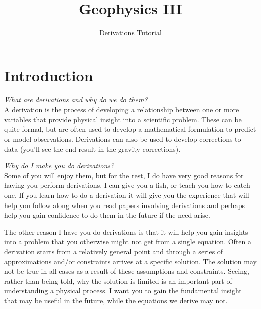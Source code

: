 \documentclass[final,a4paper,12pt]{article}
\title{Geophysics III}
\author{Derivations Tutorial}
\date{}
\begin{document}
\maketitle

\section{Introduction}
{\it What are derivations and why do we do them?} \\
A derivation is the process of developing a relationship between one or more
variables that provide physical insight into a scientific problem.  These can be
quite formal, but are often used to develop a mathematical formulation to
predict or model observations.  Derivations can also be used to develop
corrections to data (you'll see the end result in the gravity corrections).

{\it Why do I make you do derivations?} \\
Some of you will enjoy them, but for the rest, I do have very good reasons for
having you perform derivations.  I can give you a fish, or teach you how to
catch one.  If you learn how to do a derivation it will give you the experience
that will help you follow along when you read papers involving derivations and
perhaps help you gain confidence to do them in the future if the need arise.

The other reason I have you do derivations is that it will help you gain
insights into a problem that you otherwise might not get from a single equation.
Often a derivation starts from a relatively general point and through a series
of approximations and/or constraints arrives at a specific solution.  The
solution may not be true in all cases as a result of these assumptions and
constraints.  Seeing, rather than being told, why the solution is limited is an
important part of understanding a physical process.  I want you to gain the
fundamental insight that may be useful in the future, while the equations we
derive may not.
\end{document}
